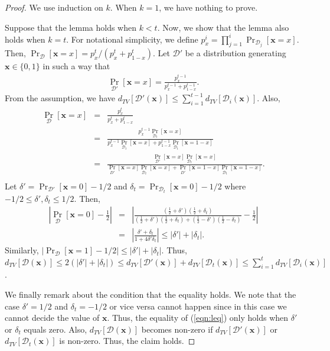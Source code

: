\documentclass[letterpaper,11pt]{article}
\newcommand{\dtv}{d_{TV}}
\newcommand{\cald}{\mathcal{D}}
\newcommand{\bfx}{\mathbf{x}}
\newcommand{\bit}{\{0,1\}}
\begin{document}
\begin{proof}
  We use induction on $k$.
  When $k=1$, we have nothing to prove.

  Suppose that the lemma holds when $k<t$.
  Now, we show that the lemma also holds when $k=t$.
  For notational simplicity,
  we define $p_x^i=\prod_{j=1}^{i}\Pr_{\cald_j}[\bfx=x]$.
  Then, $\Pr_{\cald}[\bfx=x]=p_x^t/(p_x^t+p_{1-x}^t)$.
  Let $\cald'$ be a distribution generating $\bfx\in \bit$ in such a way that
  \begin{eqnarray*}
    \Pr_{\cald'}[\bfx=x]=\frac{p_x^{t-1}}{p_x^{t-1}+p_{1-x}^{t-1}}.
  \end{eqnarray*}
  From the assumption, we have $\dtv[\cald'(\bfx)]\leq \sum_{i=1}^{t-1}\dtv[\cald_i(\bfx)]$.
  Also,
  \begin{eqnarray*}
    \Pr_{\cald}[\bfx=x]
    &=&
    \frac{p_x^t}{p_x^t+p_{1-x}^t}\\
    &=&
    \frac{p_x^{t-1}\Pr_{\cald_t}[\bfx=x]}{p_x^{t-1}\Pr_{\cald_t}[\bfx=x]+p_{1-x}^{t-1}\Pr_{\cald_t}[\bfx=1-x]}\\
    &=&
    \frac{\Pr_{\cald'}[\bfx=x]\Pr_{\cald_t}[\bfx=x]}{\Pr_{D'}[\bfx=x]\Pr_{\cald_t}[\bfx=x]+\Pr_{D'}[\bfx=1-x]\Pr_{\cald_t}[\bfx=1-x]}.\\
  \end{eqnarray*}
  Let $\delta'=\Pr_{\cald'}[\bfx=0]-1/2$ and $\delta_t=\Pr_{\cald_t}[\bfx=0]-1/2$ where $-1/2\leq \delta',\delta_t\leq 1/2$.
  Then, 
  \begin{eqnarray}
    \left| \Pr_{\cald}[\bfx=0]-\frac{1}{2} \right| 
    &=&
    \left| \frac{(\frac{1}{2}+\delta')(\frac{1}{2}+\delta_t)}{(\frac{1}{2}+\delta')(\frac{1}{2}+\delta_t)+(\frac{1}{2}-\delta')(\frac{1}{2}-\delta_t)}-\frac{1}{2} \right| \nonumber\\
    &=&
    \left| \frac{\delta'+\delta_t}{1+4\delta'\delta_t} \right| 
    \leq
    |\delta'|+|\delta_t| \label{eqn:leq}.
  \end{eqnarray}
  Similarly, $\left|\Pr_{\cald}[\bfx=1]-1/2 \right| \leq |\delta'|+|\delta_t|$.
  Thus, 
  $\dtv[\cald(\bfx)] \leq 2(|\delta'|+|\delta_t|)\leq \dtv[\cald'(\bfx)]+\dtv[\cald_t(\bfx)] \leq \sum_{i=1}^t\dtv[\cald_i(\bfx)]$.
  
  We finally remark about the condition that the equality holds.
  We note that the case $\delta'=1/2$ and $\delta_t=-1/2$ or vice versa cannot happen since in this case we cannot decide the value of $\bfx$.
  Thus, the equality of (\ref{eqn:leq}) only holds when $\delta'$ or $\delta_t$ equals zero.
  Also, $\dtv[\cald(\bfx)]$ becomes non-zero if $\dtv[\cald'(\bfx)]$ or $\dtv[\cald_t(\bfx)]$ is non-zero.
  Thus, the claim holds.
\end{proof}
\end{document}
